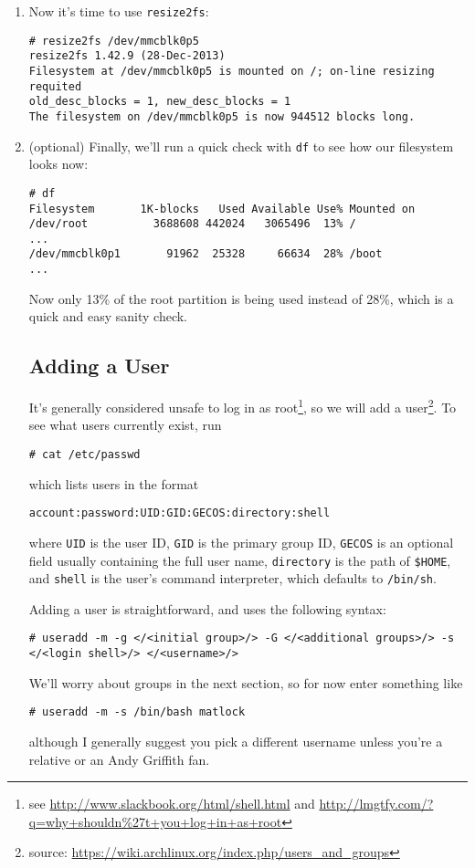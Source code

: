 \documentclass[12pt,letterpaper]{article}
\begin{document}
\begin{enumerate}
\item Now it's time to use \lstinline{resize2fs}:
\begin{lstlisting}
# resize2fs /dev/mmcblk0p5
resize2fs 1.42.9 (28-Dec-2013)
Filesystem at /dev/mmcblk0p5 is mounted on /; on-line resizing requited
old_desc_blocks = 1, new_desc_blocks = 1
The filesystem on /dev/mmcblk0p5 is now 944512 blocks long.
\end{lstlisting}

\item (optional) Finally, we'll run a quick check with \lstinline{df} to see how our filesystem looks now:
\begin{lstlisting}[basicstyle=\ttfamily\scriptsize]
# df
Filesystem       1K-blocks   Used Available Use% Mounted on
/dev/root          3688608 442024   3065496  13% /
...
/dev/mmcblk0p1       91962  25328     66634  28% /boot
...
\end{lstlisting}
Now only 13\% of the root partition is being used instead of 28\%, which is a quick and easy sanity check.

\subsection{Adding a User}

It's generally considered unsafe to log in as root\footnote{see \url{http://www.slackbook.org/html/shell.html} and \url{http://lmgtfy.com/?q=why+shouldn\%27t+you+log+in+as+root}}, so we will add a user\footnote{source: \url{https://wiki.archlinux.org/index.php/users_and_groups}}.  To see what users currently exist, run

\begin{lstlisting}
# cat /etc/passwd
\end{lstlisting}
which lists users in the format
\begin{lstlisting}
account:password:UID:GID:GECOS:directory:shell
\end{lstlisting}
where \lstinline{UID} is the user ID, \lstinline{GID} is the primary group ID, \lstinline{GECOS} is an optional field usually containing the full user name, \lstinline{directory} is the path of \lstinline{$HOME}, and \lstinline{shell} is the user's command interpreter, which defaults to \lstinline{/bin/sh}.

Adding a user is straightforward, and uses the following syntax:

\begin{lstlisting}
# useradd -m -g </<initial group>/> -G </<additional groups>/> -s </<login shell>/> </<username>/>
\end{lstlisting}
We'll worry about groups in the next section, so for now enter something like
\begin{lstlisting}
# useradd -m -s /bin/bash matlock
\end{lstlisting}
although I generally suggest you pick a different username unless you're a relative or an Andy Griffith fan.


\end{enumerate}
\end{document}
